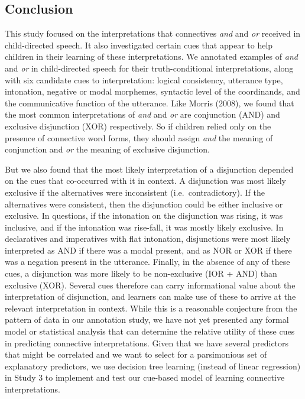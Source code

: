 \documentclass[
  english,
  ,man,floatsintext]{apa6}
\begin{document}
\hypertarget{conclusion}{%
\subsection{Conclusion}\label{conclusion}}

This study focused on the interpretations that connectives \emph{and} and \emph{or} received in child-directed speech. It also investigated certain cues that appear to help children in their learning of these interpretations. We annotated examples of \emph{and} and \emph{or} in child-directed speech for their truth-conditional interpretations, along with six candidate cues to interpretation: logical consistency, utterance type, intonation, negative or modal morphemes, syntactic level of the coordinands, and the communicative function of the utterance. Like Morris (2008), we found that the most common interpretations of \emph{and} and \emph{or} are conjunction (AND) and exclusive disjunction (XOR) respectively. So if children relied only on the presence of connective word forms, they should assign \emph{and} the meaning of conjunction and \emph{or} the meaning of exclusive disjunction.

But we also found that the most likely interpretation of a disjunction depended on the cues that co-occurred with it in context. A disjunction was most likely exclusive if the alternatives were inconsistent (i.e.~contradictory). If the alternatives were consistent, then the disjunction could be either inclusive or exclusive. In questions, if the intonation on the disjunction was rising, it was inclusive, and if the intonation was rise-fall, it was mostly likely exclusive. In declaratives and imperatives with flat intonation, disjunctions were most likely interpreted as AND if there was a modal present, and as NOR or XOR if there was a negation present in the utterance. Finally, in the absence of any of these cues, a disjunction was more likely to be non-exclusive (IOR + AND) than exclusive (XOR). Several cues therefore can carry informational value about the interpretation of disjunction, and learners can make use of these to arrive at the relevant interpretation in context. While this is a reasonable conjecture from the pattern of data in our annotation study, we have not yet presented any formal model or statistical analysis that can determine the relative utility of these cues in predicting connective interpretations. Given that we have several predictors that might be correlated and we want to select for a parsimonious set of explanatory predictors, we use decision tree learning (instead of linear regression) in Study 3 to implement and test our cue-based model of learning connective interpretations.
\end{document}
